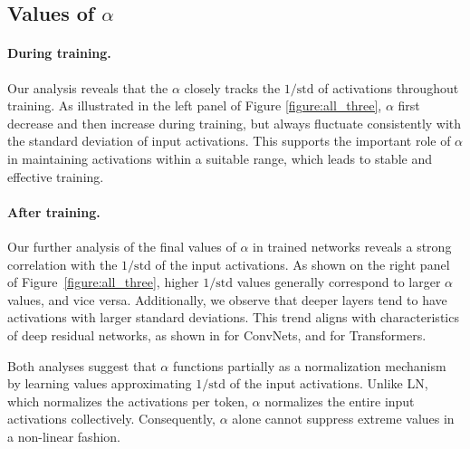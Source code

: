 \subsection{Values of $\alpha$}

\paragraph{During training.} Our analysis reveals that the $\alpha$ closely tracks the $1/\mathrm{std}$ of activations throughout training. As illustrated in the left panel of Figure \ref{figure:all_three}, $\alpha$ first decrease and then increase during training, but always fluctuate consistently with the standard deviation of input activations. This supports the important role of $\alpha$ in maintaining activations within a suitable range, which leads to stable and effective training.


\paragraph{After training.}
Our further analysis of the final values of $\alpha$ in trained networks reveals a strong correlation with the $1/\mathrm{std}$ of the input activations.
As shown on the right panel of Figure~\ref{figure:all_three}, higher $1/\mathrm{std}$ values generally correspond to larger $\alpha$ values, and vice versa. Additionally, we observe that deeper layers tend to have activations with larger standard deviations. This trend aligns with characteristics of deep residual networks, as shown in \citet{brock2021characterizing} for ConvNets, and \citet{sun2025cursedepthlargelanguage} for Transformers.


Both analyses suggest that $\alpha$ functions partially as a normalization mechanism by learning values approximating $1/\mathrm{std}$ of the input activations. Unlike LN, which normalizes the activations per token, $\alpha$ normalizes the entire input activations collectively. Consequently, $\alpha$ alone cannot suppress extreme values in a non-linear fashion. 





